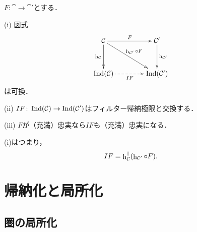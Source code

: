 \begin{Proposition}
    $F\colon\cat\to\cat'$とする．

    (i) 
    図式
    \begin{equation}
        \vcenter{\xymatrix@C=40pt@R=32pt{
        \cat
        \ar[r]^-{F}
        \ar[rd]^-{\hh_{\cat'}\circ F}
        \ar[d]_-{\hh_{\cat}}
        &\cat'
        \ar[d]^-{\hh_{\cat'}}
        \\
        \Ind(\cat)
        \ar@{.>}[r]_-{IF}
        &
        \Ind(\cat')
        }}
    \end{equation}
    は可換．

    (ii) 
    $IF\colon\mathop{\mathrm{Ind}}(\mathcal{C})\to\mathop{\mathrm{Ind}}(\mathcal{C}')$はフィルター帰納極限と交換する．

    (iii) 
    $F$が（充満）忠実なら$IF$も（充満）忠実になる．
\end{Proposition}
(i)はつまり，
\begin{equation*}
    IF=\mathop{\mathrm{h}}\nolimits_{\mathcal{C}}^\dag(\mathop{\mathrm{h}}\nolimits_{\mathcal{C}'}\circ F).
\end{equation*}


\section{帰納化と局所化}

\subsection{圏の局所化}

